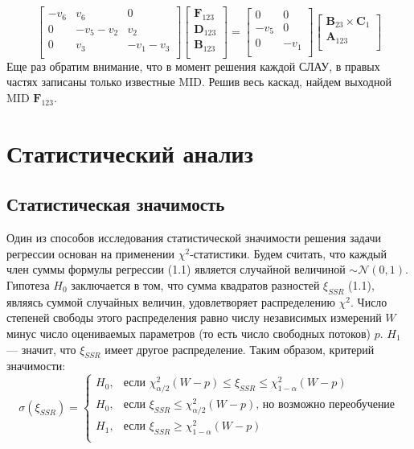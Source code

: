 \documentclass[14pt, a4paper]{extreport}
\begin{document}
$$\begin{bmatrix}
-v_6 & v_6 & 0\\
0 & -v_5-v_2 & v_2\\
0 & v_3 & -v_1-v_3\\
\end{bmatrix}
\begin{bmatrix}
\mathbf{F}_{123}\\
\mathbf{D}_{123}\\
\mathbf{B}_{123}\\
\end{bmatrix}
=
\begin{bmatrix}
0 & 0\\
-v_5 & 0\\
0 & -v_1\\
\end{bmatrix}
\begin{bmatrix}
\mathbf{B}_{23} \times \mathbf{C}_1\\
\mathbf{A}_{123}\\
\end{bmatrix}
$$
Еще раз обратим внимание, что в момент решения каждой СЛАУ, в правых частях записаны только известные MID. Решив весь каскад, найдем выходной MID $\mathbf{F}_{123}$.
\clearpage
\section{Статистический анализ}
\subsection{Статистическая значимость}
Один из способов исследования статистической значимости решения задачи регрессии основан на применении $\chi^2$-статистики\cite{shupltesov_review_2}. Будем считать, что каждый член суммы формулы регрессии (1.1) является случайной величиной $\sim \mathcal{N}(0, 1)$. Гипотеза $H_0$ заключается в том, что сумма квадратов разностей $\xi_{SSR}$ (1.1), являясь суммой случайных величин, удовлетворяет распределению $\chi^2$. Число степеней свободы этого распределения равно числу независимых измерений $W$ минус число оцениваемых параметров (то есть число свободных потоков) $p$\cite{shupltesov_review_2}. $H_1$ --- значит, что $\xi_{SSR}$ имеет другое распределение. Таким образом, критерий значимости:
$$
\sigma(\xi_{SSR}) = \begin{cases}
	H_0,&\text{если $\chi^2_{\alpha / 2}(W - p) \le \xi_{SSR} \le \chi^2_{1 - \alpha}(W - p)$}\\
	H_0,&\text{если $\xi_{SSR} \leq \chi^2_{\alpha / 2}(W - p)$, но возможно переобучение}\\
	H_1,&\text{если $\xi_{SSR} \geq \chi^2_{1 - \alpha}(W - p)$}\\
\end{cases}$$
\end{document}
